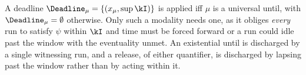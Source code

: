 A deadline $\Deadline_\mu=\{(x_\mu,\sup\kI)\}$ is applied iff $\mu$ is a universal until, with $\Deadline_\mu=\emptyset$ otherwise. Only such a modality needs one, as it obliges \emph{every} run to satisfy $\psi$ within $\kI$ and time must be forced forward or a run could idle past the window with the eventuality unmet. An existential until is discharged by a single witnessing run, and a release, of either quantifier, is discharged by lapsing past the window rather than by acting within it.

%




%
%





